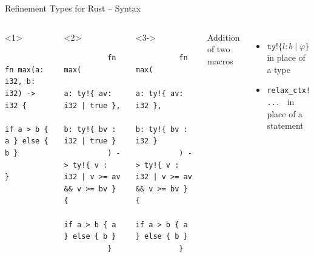 \documentclass{sdqbeamer}
\newcommand{\code}[1]{\texttt{#1}}
\begin{document}
\begin{frame}[fragile]{Refinement Types for Rust -- Syntax}
  \begin{columns}
      \begin{onlyenv}<1>
        \begin{verbatim}
          fn max(a: i32, b: i32) -> i32 {
            if a > b { a } else { b }
          }
        \end{verbatim}
      \end{onlyenv}
      \begin{onlyenv}<2>
        \begin{verbatim}
          fn max(
            a: ty!{ av: i32 | true }, 
            b: ty!{ bv : i32 | true }
          ) -> ty!{ v : i32 | v >= av && v >= bv } {
            if a > b { a } else { b }
          }
        \end{verbatim}
      \end{onlyenv}
      \begin{onlyenv}<3->
        \begin{verbatim}
          fn max(
            a: ty!{ av: i32 }, 
            b: ty!{ bv : i32 }
          ) -> ty!{ v : i32 | v >= av && v >= bv } {
            if a > b { a } else { b }
          }
        \end{verbatim}
      \end{onlyenv}

    Addition of two macros
    \begin{itemize}
      \item $\code{ty!}\{ l : b \mid \varphi \}$ in place of a type
      \item \texttt{relax_ctx!{ ... }} in place of a statement
    \end{itemize}
  \end{columns}
\end{frame}
\end{document}
